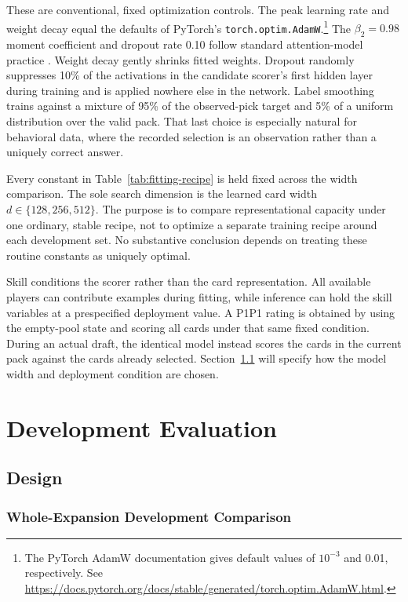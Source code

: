 \documentclass[11pt]{article}
\numberwithin{equation}{section}
\begin{document}
These are conventional, fixed optimization controls. The peak learning rate
and weight decay equal the defaults of PyTorch's
\texttt{torch.optim.AdamW}.\footnote{The PyTorch AdamW documentation gives
default values of $10^{-3}$ and 0.01, respectively. See
\url{https://docs.pytorch.org/docs/stable/generated/torch.optim.AdamW.html}.}
The $\beta_2=0.98$ moment coefficient and dropout rate 0.10 follow standard
attention-model practice \citep{vaswani2017}. Weight decay gently
shrinks fitted weights. Dropout randomly suppresses 10\% of the activations in
the candidate scorer's first hidden layer during training and is applied nowhere
else in the network. Label smoothing trains against a mixture of 95\% of the
observed-pick target and 5\% of a uniform distribution over the valid pack.
That last choice is especially natural for behavioral data, where the recorded
selection is an observation rather than a uniquely correct answer.

Every constant in Table~\ref{tab:fitting-recipe} is held fixed across the
width comparison. The sole search dimension is the learned card width
$d\in\{128,256,512\}$. The purpose is to compare representational capacity
under one ordinary, stable recipe, not to optimize a separate training recipe
around each development set. No substantive conclusion depends on treating
these routine constants as uniquely optimal.

Skill conditions the scorer rather than the card representation. All available
players can contribute examples during fitting, while inference can hold the
skill variables at a prespecified deployment value. A P1P1 rating is obtained
by using the empty-pool state and scoring all cards under that same fixed
condition. During an actual draft, the identical model instead scores the cards
in the current pack against the cards already selected.
Section~\ref{sec:experimental-design} will specify how the model width and
deployment condition are chosen.

\section{Development Evaluation}
\label{sec:development-evaluation}

\subsection{Design}
\label{sec:experimental-design}

\subsubsection{Whole-Expansion Development Comparison}
\label{sec:development-design}
\end{document}
